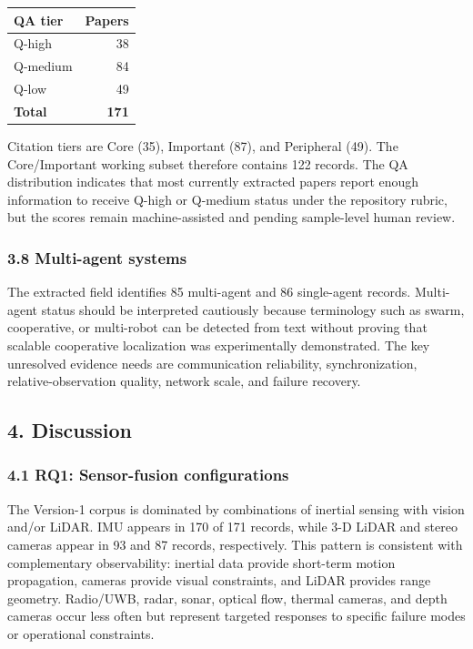 \documentclass[
  journal]{IEEEtran}
\newcounter{none} %
\begin{document}
{\def\LTcaptype{none} %
\begin{longtable}[]{@{}lr@{}}
\toprule\noalign{}
QA tier & Papers \\
\midrule\noalign{}
\endhead
\bottomrule\noalign{}
\endlastfoot
Q-high & 38 \\
Q-medium & 84 \\
Q-low & 49 \\
\textbf{Total} & \textbf{171} \\
\end{longtable}
}

Citation tiers are Core (35), Important (87), and Peripheral (49). The
Core/Important working subset therefore contains 122 records. The QA
distribution indicates that most currently extracted papers report
enough information to receive Q-high or Q-medium status under the
repository rubric, but the scores remain machine-assisted and pending
sample-level human review.

\subsubsection{3.8 Multi-agent systems}\label{38-multi-agent-systems}

The extracted field identifies 85 multi-agent and 86 single-agent
records. Multi-agent status should be interpreted cautiously because
terminology such as swarm, cooperative, or multi-robot can be detected
from text without proving that scalable cooperative localization was
experimentally demonstrated. The key unresolved evidence needs are
communication reliability, synchronization, relative-observation
quality, network scale, and failure recovery.

\subsection{4. Discussion}\label{4-discussion}

\subsubsection{4.1 RQ1: Sensor-fusion
configurations}\label{41-rq1-sensor-fusion-configurations}

The Version-1 corpus is dominated by combinations of inertial sensing
with vision and/or LiDAR. IMU appears in 170 of 171 records, while 3-D
LiDAR and stereo cameras appear in 93 and 87 records, respectively. This
pattern is consistent with complementary observability: inertial data
provide short-term motion propagation, cameras provide visual
constraints, and LiDAR provides range geometry. Radio/UWB, radar, sonar,
optical flow, thermal cameras, and depth cameras occur less often but
represent targeted responses to specific failure modes or operational
constraints.
\end{document}
